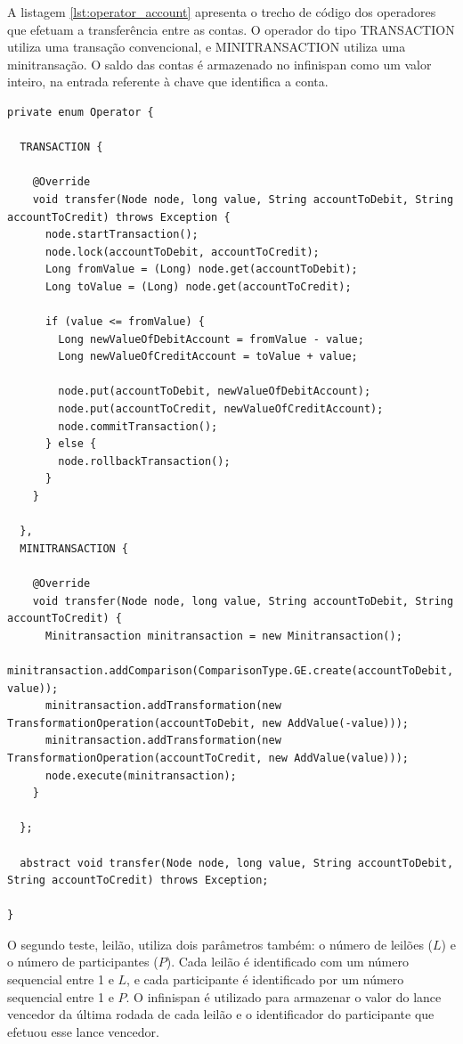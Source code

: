 \documentclass[11pt,twoside,a4paper]{book}
\begin{document}
A listagem \ref{lst:operator_account} apresenta o trecho de código dos operadores que efetuam a transferência entre as contas. O operador do tipo TRANSACTION utiliza uma transação convencional, e MINITRANSACTION utiliza uma minitransação. O saldo das contas é armazenado no infinispan como um valor inteiro, na entrada referente à chave que identifica a conta. 

\begin{lstlisting}[caption={Operadores que executam as transferências}, label=lst:operator_account]
private enum Operator {

  TRANSACTION {

    @Override
    void transfer(Node node, long value, String accountToDebit, String accountToCredit) throws Exception {
      node.startTransaction();
      node.lock(accountToDebit, accountToCredit);
      Long fromValue = (Long) node.get(accountToDebit);
      Long toValue = (Long) node.get(accountToCredit);

      if (value <= fromValue) {
        Long newValueOfDebitAccount = fromValue - value;
        Long newValueOfCreditAccount = toValue + value;

        node.put(accountToDebit, newValueOfDebitAccount);
        node.put(accountToCredit, newValueOfCreditAccount);
        node.commitTransaction();
      } else {
        node.rollbackTransaction();
      }
    }

  },
  MINITRANSACTION {

    @Override
    void transfer(Node node, long value, String accountToDebit, String accountToCredit) {
      Minitransaction minitransaction = new Minitransaction();
      minitransaction.addComparison(ComparisonType.GE.create(accountToDebit, value));
      minitransaction.addTransformation(new TransformationOperation(accountToDebit, new AddValue(-value)));
      minitransaction.addTransformation(new TransformationOperation(accountToCredit, new AddValue(value)));
      node.execute(minitransaction);
    }

  };

  abstract void transfer(Node node, long value, String accountToDebit, String accountToCredit) throws Exception;

}
\end{lstlisting}

O segundo teste, leilão, utiliza dois parâmetros também: o número de leilões ($L$) e o número de participantes ($P$). Cada leilão é identificado com um número sequencial entre 1 e $L$, e cada participante é identificado por um número sequencial entre 1 e $P$. O infinispan é utilizado para armazenar o valor do lance vencedor da última rodada de cada leilão e o identificador do participante que efetuou esse lance vencedor.
\end{document}
